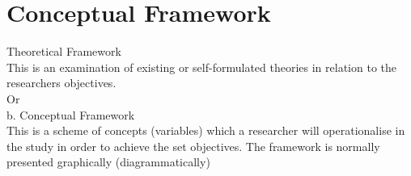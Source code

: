 \section{Conceptual Framework}

Theoretical Framework\\
This is an examination of existing or self-formulated theories in relation to the researchers objectives.\\
Or\\
b. Conceptual Framework\\
This is a scheme of concepts (variables) which a researcher will operationalise in the study in order to achieve the set objectives. The framework is normally presented graphically (diagrammatically)
